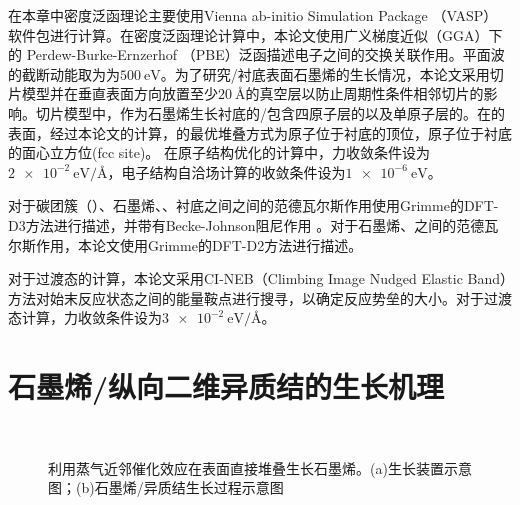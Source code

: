 在本章中密度泛函理论主要使用Vienna ab-initio Simulation Package （VASP） 软件包进行计算。在密度泛函理论计算中，本论文使用广义梯度近似（GGA）下的 Perdew-Burke-Ernzerhof （PBE）泛函描述电子之间的交换关联作用。平面波的截断动能取为为$\SI{500}{\electronvolt}$。为了研究/衬底表面石墨烯的生长情况，本论文采用切片模型并在垂直表面方向放置至少$\SI{20}{\angstrom}$的真空层以防止周期性条件相邻切片的影响。切片模型中，作为石墨烯生长衬底的/包含四原子层的以及单原子层的。在的表面，经过本论文的计算，的最优堆叠方式为原子位于衬底的顶位，原子位于衬底的面心立方位(fcc site)。
在原子结构优化的计算中，力收敛条件设为$\SI{2e-2}{\electronvolt \per \angstrom}$，电子结构自洽场计算的收敛条件设为$\SI{1e-6}{\electronvolt}$。

对于碳团簇（）、石墨烯、、衬底之间之间的范德瓦尔斯作用使用Grimme的DFT-D3方法进行描述，并带有Becke-Johnson阻尼作用 。对于石墨烯、之间的范德瓦尔斯作用，本论文使用Grimme的DFT-D2方法进行描述。

对于过渡态的计算，本论文采用CI-NEB（Climbing Image Nudged Elastic Band）方法对始末反应状态之间的能量鞍点进行搜寻，以确定反应势垒的大小。对于过渡态计算，力收敛条件设为$\SI{3e-2}{\electronvolt \per \angstrom}$。

\section{石墨烯/纵向二维异质结的生长机理}
    \label{cap:CG}
    \begin{figure}[htb]
        \\[-0.5ex]
        \caption{利用蒸气近邻催化效应在表面直接堆叠生长石墨烯。(a)生长装置示意图；(b)石墨烯/异质结生长过程示意图}
        \label{fig:CG_diagram_CVD}
    \end{figure}

